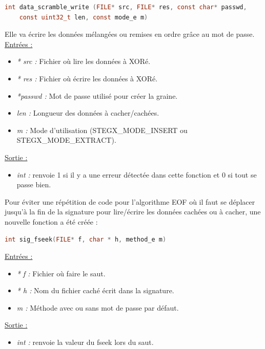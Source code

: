 \documentclass[11pt]{article}
\begin{document}
\begin{lstlisting}[language=c]
int data_scramble_write (FILE* src, FILE* res, const char* passwd, 
	const uint32_t len, const mode_e m)
\end{lstlisting}

Elle va écrire les données mélangées ou remises en ordre grâce au mot de 
passe. 
\newline
\underline{Entrées :}
\begin{itemize}
\item \textit{* src :} Fichier où lire les données à XORé. 
\item \textit{* res :} Fichier où écrire les données à XORé. 
\item \textit{*passwd :} Mot de passe utilisé pour créer la graine. 
\item \textit{len :} Longueur des données à cacher/cachées. 
\item \textit{m :} Mode d'utilisation (STEGX\_MODE\_INSERT ou STEGX\_MODE\_EXTRACT). 
\end{itemize}
\underline{Sortie :} 
\begin{itemize}
\item \textit{int :} renvoie 1 si il y a une erreur détectée dans cette 
fonction et 0 si tout se passe bien. 
\newline 
\end{itemize}

Pour éviter une répétition de code pour l'algorithme EOF où il faut se 
déplacer jusqu'à la fin de la signature pour lire/écrire les données cachées
 ou à cacher, une nouvelle fonction a été créée : 

\begin{lstlisting}[language=c]
int sig_fseek(FILE* f, char * h, method_e m)
\end{lstlisting}
\underline{Entrées :}
\begin{itemize}
\item \textit{* f :} Fichier où faire le saut. 
\item \textit{* h :} Nom du fichier caché écrit dans la signature. 
\item \textit{m :} Méthode avec ou sans mot de passe par défaut. 
\end{itemize}
\underline{Sortie :} 
\begin{itemize}
\item \textit{int :} renvoie la valeur du fseek lors du saut. 
\newline 
\end{itemize}
\end{document}
